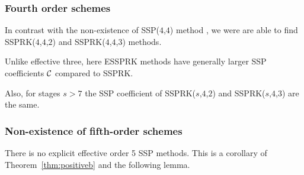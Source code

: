 

\subsubsection{Fourth order schemes}\label{subsubsection3.4.2}

\begin{result}
  In contrast with the non-existence of SSP(\( 4 \),\( 4 \)) method
  \cite{Gottlieb1998,Ruuth2002}, we were are able to
  find SSPRK(\( 4 \),\( 4 \),\( 2 \)) and SSPRK(\( 4 \),\( 4 \),\( 3
  \)) methods.
\end{result}

Unlike effective three, here ESSPRK methods have generally larger SSP coefficients $\mathcal{C}$ compared to SSPRK.



 Also, for stages \( s > 7 \) the SSP coefficient of SSPRK(\( s \),\( 4 \),\( 2 \)) and SSPRK(\( s \),\( 4 \),\( 3 \)) are the same.




\subsubsection{Non-existence of fifth-order schemes}\label{sec:noESSP5}

There is no explicit effective order 5 SSP methods.  This is a corollary of Theorem~\ref{thm:positiveb} and the following lemma.

